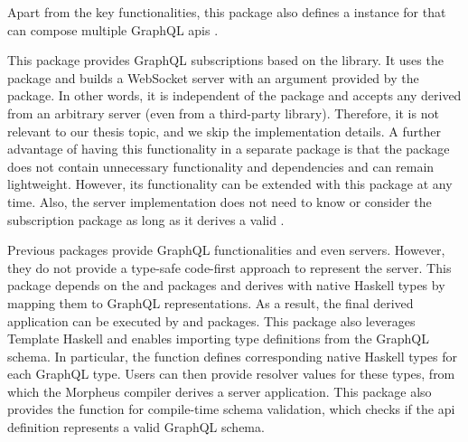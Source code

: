 \begin{enumerate}
  Apart from the key functionalities, this package also 
  defines a \Semigroup instance for  that 
  can compose multiple GraphQL \gls{apis} . 

   This package provides GraphQL subscriptions based on the \WebSockets library. 
  It uses the \corePackage package and builds a WebSocket server 
  with an  argument provided by the \appPackage package. 
  In other words, it is independent of the \serverPackage package and 
  accepts any  derived from an arbitrary server 
  (even from a third-party library). Therefore, it is not relevant to our thesis topic, and we skip the implementation details. A further advantage of having this functionality in a separate package is that the \serverPackage package does not contain unnecessary functionality and dependencies and can remain lightweight. 
  However, its functionality can be extended with this package at any time. Also, the server implementation does not need to know or consider the subscription package as long as it derives a valid .

  Previous packages provide GraphQL functionalities and even servers. However, they do not provide a type-safe code-first approach to represent the server. 
  This package depends on the \corePackage and \appPackage packages and derives  with native Haskell types by mapping them to GraphQL representations. As a result, the final derived application can be executed by \appPackage and \subsPackage packages.
  This package also leverages Template Haskell and enables importing type definitions from the GraphQL schema. In particular, the  function defines corresponding native Haskell types for each GraphQL type. Users can then provide resolver values for these types, from which the Morpheus compiler derives a server application. 
  This package also provides the function  for compile-time schema validation, which checks if the \gls{api} definition represents a valid GraphQL schema.

\end{enumerate}


